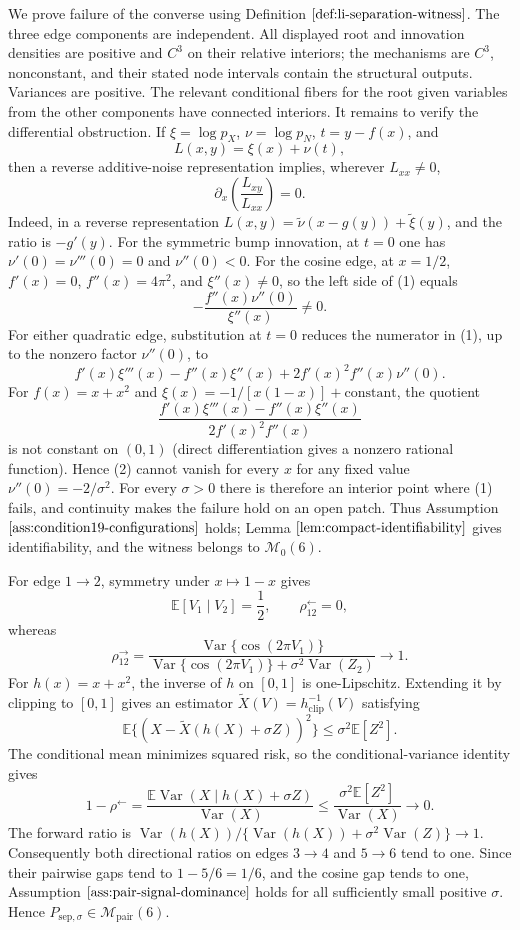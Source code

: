We prove failure of the converse using Definition \(\ref{def:li-separation-witness}\).  The three edge components are independent.  All displayed root and innovation densities are positive and \(C^3\) on their relative interiors; the mechanisms are \(C^3\), nonconstant, and their stated node intervals contain the structural outputs.  Variances are positive.  The relevant conditional fibers for the root given variables from the other components have connected interiors.  It remains to verify the differential obstruction.  If \(\xi=\log p_X\), \(\nu=\log p_N\), \(t=y-f(x)\), and
\[
 L(x,y)=\xi(x)+\nu(t),
\]
then a reverse additive-noise representation implies, wherever \(L_{xx}\ne0\),
\[
 \partial_x\!\left(\frac{L_{xy}}{L_{xx}}\right)=0. \tag{1}
\]
Indeed, in a reverse representation \(L(x,y)=\widetilde\nu(x-g(y))+\widetilde\xi(y)\), and the ratio is \(-g'(y)\).  For the symmetric bump innovation, at \(t=0\) one has \(\nu'(0)=\nu'''(0)=0\) and \(\nu''(0)<0\).  For the cosine edge, at \(x=1/2\), \(f'(x)=0\), \(f''(x)=4\pi^2\), and \(\xi''(x)\ne0\), so the left side of (1) equals
\[
 -\frac{f''(x)\nu''(0)}{\xi''(x)}\ne0.
\]
For either quadratic edge, substitution at \(t=0\) reduces the numerator in (1), up to the nonzero factor \(\nu''(0)\), to
\[
 f'(x)\xi'''(x)-f''(x)\xi''(x)+2f'(x)^2f''(x)\nu''(0). \tag{2}
\]
For \(f(x)=x+x^2\) and \(\xi(x)=-1/[x(1-x)]+\mathrm{constant}\), the quotient
\[
 \frac{f'(x)\xi'''(x)-f''(x)\xi''(x)}{2f'(x)^2f''(x)}
\]
is not constant on \((0,1)\) (direct differentiation gives a nonzero rational function).  Hence (2) cannot vanish for every \(x\) for any fixed value \(\nu''(0)=-2/\sigma^2\).  For every \(\sigma>0\) there is therefore an interior point where (1) fails, and continuity makes the failure hold on an open patch.  Thus Assumption \(\ref{ass:condition19-configurations}\) holds; Lemma \(\ref{lem:compact-identifiability}\) gives identifiability, and the witness belongs to \(\mathcal M_0(6)\).

For edge \(1\to2\), symmetry under \(x\mapsto1-x\) gives
\[
 \mathbb E[V_1\mid V_2]=\frac12,
 \qquad \rho^{\leftarrow}_{12}=0,
\]
whereas
\[
 \rho^{\to}_{12}
 =\frac{\operatorname{Var}\{\cos(2\pi V_1)\}}
 {\operatorname{Var}\{\cos(2\pi V_1)\}+\sigma^2\operatorname{Var}(Z_2)}
 \longrightarrow1.
\]
For \(h(x)=x+x^2\), the inverse of \(h\) on \([0,1]\) is one-Lipschitz.  Extending it by clipping to \([0,1]\) gives an estimator \(\widetilde X(V)=h^{-1}_{\mathrm{clip}}(V)\) satisfying
\[
 \mathbb E\{(X-\widetilde X(h(X)+\sigma Z))^2\}
 \le \sigma^2\mathbb E[Z^2].
\]
The conditional mean minimizes squared risk, so the conditional-variance identity gives
\[
 1-\rho^{\leftarrow}
 =\frac{\mathbb E\operatorname{Var}(X\mid h(X)+\sigma Z)}{\operatorname{Var}(X)}
 \le\frac{\sigma^2\mathbb E[Z^2]}{\operatorname{Var}(X)}\longrightarrow0.
\]
The forward ratio is \(\operatorname{Var}(h(X))/\{\operatorname{Var}(h(X))+\sigma^2\operatorname{Var}(Z)\}\to1\).  Consequently both directional ratios on edges \(3\to4\) and \(5\to6\) tend to one.  Since their pairwise gaps tend to \(1-5/6=1/6\), and the cosine gap tends to one, Assumption \(\ref{ass:pair-signal-dominance}\) holds for all sufficiently small positive \(\sigma\).  Hence \(P_{\mathrm{sep},\sigma}\in\mathcal M_{\mathrm{pair}}(6)\).

